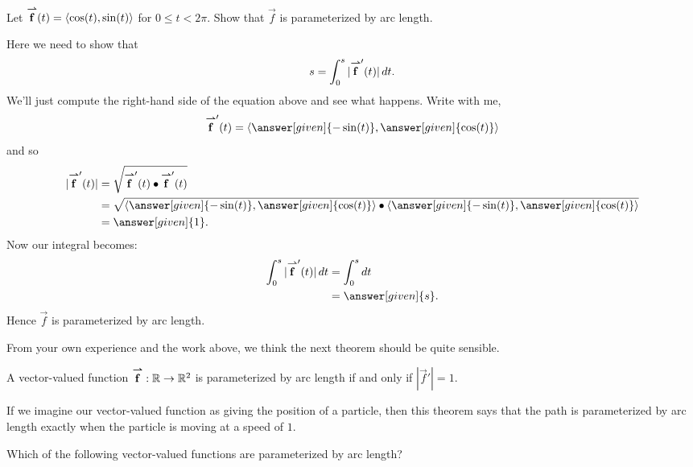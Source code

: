 \documentclass{ximera}
\begin{document}
\begin{example}
  Let ${\overset{\boldsymbol{\rightharpoonup}}{\mathbf{f}}}(t) = \left\langle \cos(t), \sin(t)\right\rangle$ for $0\le t<
  2\pi$. Show that $\vec{f}$ is parameterized by arc length.
  \begin{explanation}
    Here we need to show that
    \[
    s = \int_0^s |{\overset{\boldsymbol{\rightharpoonup}}{\mathbf{f}}}'(t)| \mathop{}\!d t.
    \]
    We'll just compute the right-hand side of the equation above and
    see what happens. Write with me,
    \[
    \vec{f}'(t) = \vector{\answer[given]{-\sin(t)},\answer[given]{\cos(t)}}
    \]
    and so
    \begin{align*}
      |\vec{f}'(t)| &= \sqrt{\vec{f}'(t)\dotp \vec{f}'(t)}\\
      &= \sqrt{\vector{\answer[given]{-\sin(t)},\answer[given]{\cos(t)}}\dotp\vector{\answer[given]{-\sin(t)},\answer[given]{\cos(t)}}}\\
      &= \answer[given]{1}.
    \end{align*}
    Now our integral becomes:
    \begin{align*}
      \int_0^s  |\vec{f}'(t)| \d t &= \int_0^s \d t\\
      &= \answer[given]{s}.
    \end{align*}
    Hence $\vec{f}$ is parameterized by arc length.
  \end{explanation}
\end{example}

From your own experience and the work above, we think the next
theorem should be quite sensible.

\begin{theorem}
  A vector-valued function ${\overset{\boldsymbol{\rightharpoonup}}{\mathbf{f}}}:\mathbb R\to \mathbb R^2$ is parameterized by
  arc length if and only if $|\vec{f}'| = 1$.
\end{theorem}

If we imagine our vector-valued function as giving the position of a
particle, then this theorem says that the path is parameterized by arc
length exactly when the particle is moving at a speed of $1$.

\begin{question}
  Which of the following vector-valued functions are parameterized
  by arc length?
  \begin{selectAll}
  \end{selectAll}
\end{question}
\end{document}
